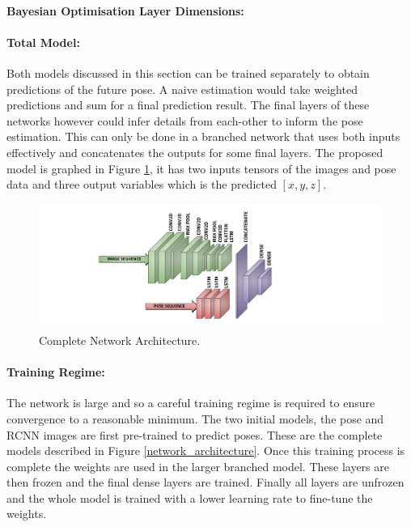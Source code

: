 \documentclass[11pt,twoside]{report}
\begin{document}
\paragraph{Bayesian Optimisation Layer Dimensions:}

\paragraph{Total Model:}
Both models discussed in this section can be trained separately to obtain predictions of the future pose. A naive estimation would take weighted predictions and sum for a final prediction result. The final layers of these networks however could infer details from each-other to inform the pose estimation. This can only be done in a branched network that uses both inputs effectively and concatenates the outputs for some final layers. The proposed model is graphed in Figure \ref{total_network_architecture}, it has two inputs tensors of the images and pose data and three output variables which is the predicted $[x,y,z]$.

\noindent \begin{figure}[h!]
	\includegraphics[width = 1.0\hsize]{figures/final_model.png}
	\caption{Complete Network Architecture.}
	\label{total_network_architecture}
\end{figure}

\paragraph{Training Regime: }The network is large and so a careful training regime is required to ensure convergence to a reasonable minimum. The two initial models, the pose and RCNN images are first pre-trained to predict poses. These are the complete models described in Figure \ref{network_architecture}. Once this training process is complete the weights are used in the larger branched model. These layers are then frozen and the final dense layers are trained. Finally all layers are unfrozen and the whole model is trained with a lower learning rate to fine-tune the weights.
\end{document}
